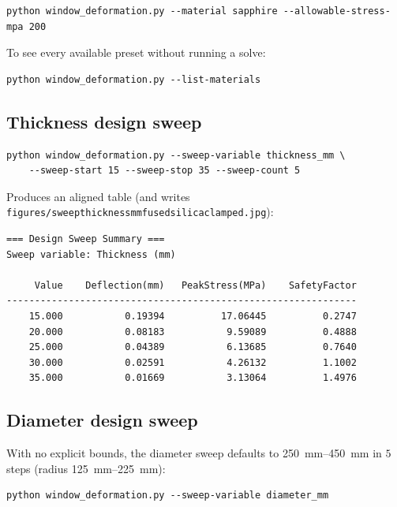 \documentclass[11pt]{article}
\newcommand{\codeus}{\textunderscore\allowbreak}
\DeclareRobustCommand{\code}[1]{\texttt{\ifmmode\else\renewcommand{\_}{\codeus}\fi#1}}
\begin{document}
\begin{lstlisting}[style=shellstyle]
python window_deformation.py --material sapphire --allowable-stress-mpa 200
\end{lstlisting}

\noindent To see every available preset without running a solve:

\begin{lstlisting}[style=shellstyle]
python window_deformation.py --list-materials
\end{lstlisting}

\subsection{Thickness design sweep}

\begin{lstlisting}[style=shellstyle]
python window_deformation.py --sweep-variable thickness_mm \
    --sweep-start 15 --sweep-stop 35 --sweep-count 5
\end{lstlisting}

\noindent Produces an aligned table (and writes\\
\code{figures/sweep\_thickness\_mm\_fused\_silica\_clamped.jpg}):

\begin{lstlisting}[style=shellstyle]
=== Design Sweep Summary ===
Sweep variable: Thickness (mm)

     Value    Deflection(mm)   PeakStress(MPa)    SafetyFactor
--------------------------------------------------------------
    15.000           0.19394          17.06445          0.2747
    20.000           0.08183           9.59089          0.4888
    25.000           0.04389           6.13685          0.7640
    30.000           0.02591           4.26132          1.1002
    35.000           0.01669           3.13064          1.4976
\end{lstlisting}

\subsection{Diameter design sweep}

With no explicit bounds, the diameter sweep defaults to \qtyrange{250}{450}{\milli\meter} in $5$
steps (radius \qtyrange{125}{225}{\milli\meter}):

\begin{lstlisting}[style=shellstyle]
python window_deformation.py --sweep-variable diameter_mm
\end{lstlisting}
\end{document}
